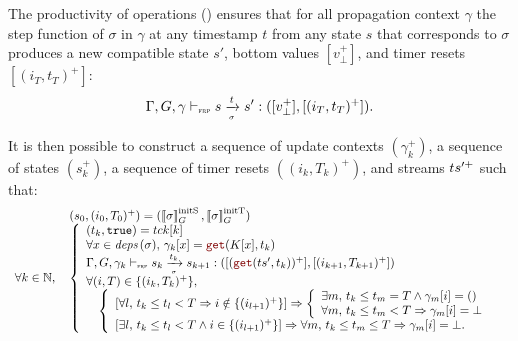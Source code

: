\begin{skippableproof}
    The productivity of \GRFRP operations ()
    ensures that for all propagation context $\gamma$ the step function of $\sigma$ in $\gamma$ at
    any timestamp $t$ from any state $s$ that corresponds to $\sigma$ produces a new compatible
    state $s'$, bottom values $[v_\bot^+]$, and timer resets $[(i_T, t_T)^+]$:
    \begin{equation*}
        \Gamma, G, \gamma \vdash_{\textnormal{\tiny\textsc{frp}}} s \xrightarrow[\mbox{\tiny\ensuremath{\sigma}}]{t} s': ([v_\bot^+], [(i_T, t_T)^+]).
    \end{equation*}

    It is then possible to construct a sequence of update contexts $(\gamma_k^+)$, a sequence of
    states $(s_k^+)$, a sequence of timer resets $((i_k, T_k)^+)$, and streams $ts^{\prime+}$ such
    that:
    \begin{equation*}
        \begin{array}{ll}
                                 & (s_0, (i_0, T_0)^+) = (\initstate{\sigma}, \inittimer{\sigma}) \\
            \forall k \in \N, \, &
            \left\{
            \begin{array}{l}
                (t_k, \true) = \tck[k]                                                                        \\
                \forall x \in \depSet{\sigma}, \, \gamma_k[x] = \getAt{K[x]}{t_k}                             \\
                \sigmaOpSem{\gamma_k}{s_k}{\sigma}{t_k}{s_{k+1}}{(\getAt{\ts'}{t_k})^+}{(i_{k+1}, T_{k+1})^+} \\
                \forall (i, T) \in \{(i_k, T_k)^+\},                                                          \\
                \quad \left\{
                \begin{array}{l}
                    \left[\forall l, \, t_k \le t_l < T \Rightarrow i \notin \{(i_{l+1})^+\} \right]
                    \Rightarrow
                    \left\{\begin{array}{l}
                               \exists m, \, t_k \le t_m = T \wedge \gamma_m[i] = () \\
                               \forall m, \, t_k \le t_m < T \Rightarrow \gamma_m[i] = \bot
                           \end{array}\right.          \\
                    \left[\exists l, \, t_k \le t_l < T \wedge i \in \{(i_{l+1})^+\} \right]
                    \Rightarrow \forall m, \, t_k \le t_m \le T \Rightarrow \gamma_m[i] = \bot. \\
                \end{array}
                \right.
            \end{array}
            \right.
        \end{array}
    \end{equation*}


\end{skippableproof}
